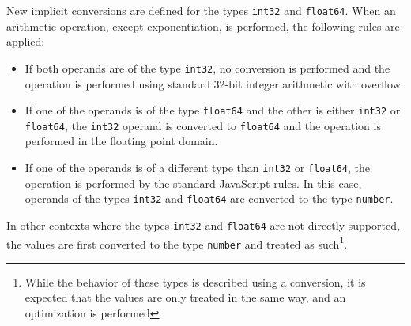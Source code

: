 New implicit conversions are defined for the types \texttt{int32} and \texttt{float64}. When an arithmetic operation, except exponentiation, is performed, the following rules are applied:

\begin{itemize}
    \item If both operands are of the type \texttt{int32}, no conversion is performed and the operation is performed using standard 32-bit integer arithmetic with overflow.
    \item If one of the operands is of the type \texttt{float64} and the other is either \texttt{int32} or \texttt{float64}, the \texttt{int32} operand is converted to \texttt{float64} and the operation is performed in the floating point domain.
    \item If one of the operands is of a different type than \texttt{int32} or \texttt{float64}, the operation is performed by the standard JavaScript rules. In this case, operands of the types \texttt{int32} and \texttt{float64} are converted to the type \texttt{number}.
\end{itemize}

In other contexts where the types \texttt{int32} and \texttt{float64} are not directly supported, the values are first converted to the type \texttt{number} and treated as such\footnote{While the behavior of these types is described using a conversion, it is expected that the values are only treated in the same way, and an optimization is performed}.



